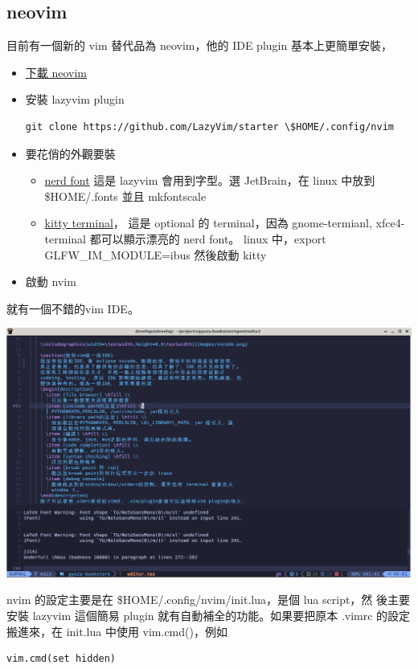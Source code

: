       \subsection{neovim}
      目前有一個新的 vim 替代品為 neovim，他的 IDE plugin 基本上更簡單安裝，
      \begin{itemize}
        \item \href{https://github.com/neovim/neovim/blob/master/INSTALL.md}{下載 neovim}
        \item 安裝 lazyvim plugin
        \begin{verbatim}
git clone https://github.com/LazyVim/starter \$HOME/.config/nvim
        \end{verbatim}
        \item 要花俏的外觀要裝
          \begin{itemize}
            \item \href{https://www.nerdfonts.com/}{nerd font} 這是 lazyvim
              會用到字型。選 JetBrain，在 linux 中放到 \$HOME/.fonts 並且
              mkfontscale
            \item \href{https://sw.kovidgoyal.net/kitty/}{kitty terminal}，
              這是 optional 的 terminal，因為 gnome-termianl, xfce4-terminal
              都可以顯示漂亮的 nerd font。
              linux 中，export GLFW\_IM\_MODULE=ibus 然後啟動 kitty
          \end{itemize}
        \item 啟動 nvim
      \end{itemize}
      就有一個不錯的vim IDE。
      \begin{center}
      \includegraphics[width=\textwidth,height=0.6\textwidth]{images/nvim.png}
      \end{center}
      nvim 的設定主要是在 \$HOME/.config/nvim/init.lua，是個 lua script，然
      後主要安裝 lazyvim 這個簡易 plugin 就有自動補全的功能。如果要把原本
      .vimrc 的設定搬進來，在 init.lua 中使用 vim.cmd()，例如
      \begin{verbatim}
vim.cmd(set hidden)
      \end{verbatim}

